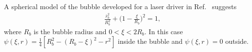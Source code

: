 \documentclass[twocolumn,showpacs,aip]{revtex4}
\begin{document}
A  spherical model of the bubble  developed 
for a laser driver 
in Ref.~\cite{Kostyukov_phenomenological_2004} suggests
\begin{eqnarray}
&&\frac{\bar{r}_b^2}{R_b^2}+{\bigg(1-\frac{\xi}{R_b}\bigg)^2}=1, \label{eq:standard_boundary}
\end{eqnarray}
where $R_b$ is  the bubble radius and $0<\xi<2R_b$.  In this case  $\psi(\xi,r)= \frac{1}{4}[R_b^2-(R_b-\xi)^2-r^2]$ inside  the bubble and  $\psi(\xi,r)= 0$ outside.
\end{document}
